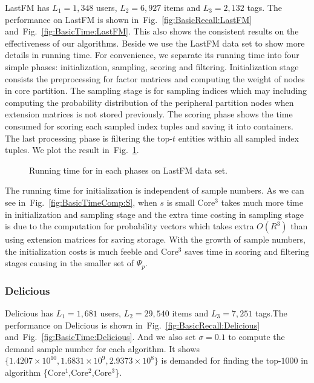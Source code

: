 \documentclass[10pt,journal,compsoc]{IEEEtran}
\newcommand{\Fig}[1]{Fig.~\ref{fig:#1}}
\begin{document}
LastFM has $L_1 = 1,348$ users, $L_2 = 6,927$ items and $L_3 = 2,132$ tags. The performance on LastFM is shown in~\Fig{BasicRecall:LastFM} and~\Fig{BasicTime:LastFM}. This also shows the consistent results on the effectiveness of our algorithms. Beside we use the LastFM data set to show more details in running time. For convenience, we separate its running time into four simple phases: initialization, sampling, scoring and filtering. Initialization stage consists the preprocessing for factor matrices and computing the weight of nodes in core partition. The sampling stage is for sampling indices which may including computing the probability distribution of the peripheral partition nodes when extension matrices is not stored previously. The scoring phase shows the time consumed for scoring each sampled index tuples and saving it into containers. The last processing phase is filtering the top-$t$ entities within all sampled index tuples. We plot the result in~\Fig{BasicTimeComp}.
\begin{figure}[!ht]
	\centering
	\caption{Running time for in each phases on LastFM data set.}
	\label{fig:BasicTimeComp}
\end{figure}

The running time for initialization is independent of sample numbers. As we can see in~\Fig{BasicTimeComp:S}, when $s$ is small Core$^3$ takes much more time in initialization and sampling stage and the extra time costing in sampling stage is due to the computation for probability vectors which takes extra $O(R^3)$ than using extension matrices for saving storage. With the growth of sample numbers, the initialization costs is much feeble and Core$^3$ saves time in scoring and filtering stages causing in the smaller set of $\Psi_p$.

\subsubsection{Delicious}
Delicious has $L_1 = 1,681$ users, $L_2 = 29,540$ items and $L_3 = 7,251$ tags.The performance on Delicious is shown in~\Fig{BasicRecall:Delicious} and~\Fig{BasicTime:Delicious}. And we also set $\sigma=0.1$ to compute the demand sample number for each algorithm. It shows $\{1.4207\times10^{10},1.6831\times10^9,2.9373\times10^8\}$ is demanded for finding the top-$1000$ in algorithm \{Core$^1$,Core$^2$,Core$^3$\}. 
\end{document}
